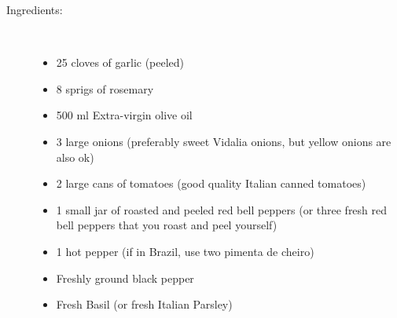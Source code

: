 \documentclass [11pt, letterpaper] {article}
\begin{document}
\begin{description}

\item[Ingredients:]\ \\
	\begin{itemize}
	\item 25 cloves of garlic (peeled)
	\item 8 sprigs of rosemary
	\item 500 ml Extra-virgin olive oil
	\item 3 large onions (preferably sweet Vidalia onions, but yellow onions are also ok)
	\item 2 large cans of tomatoes (good quality Italian canned tomatoes) 
	\item 1 small jar of roasted and peeled red bell peppers (or three fresh red bell peppers that you roast and peel yourself) 
	\item 1 hot pepper (if in Brazil, use two pimenta de cheiro)
	\item Freshly ground black pepper
	\item Fresh Basil (or fresh Italian Parsley)
	\end{itemize}


\end{description}
\end{document}

